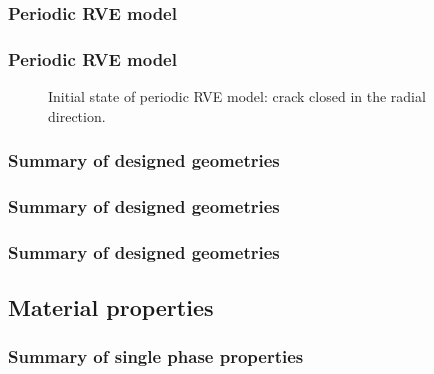 \documentclass[first,firstsupp,lastsupp,handout,last,hyperref,table]{ETHclass}
\begin{document}
\begin{frame}
\frametitle{Periodic RVE model}
\vspace{-0.5cm}
\centering
\begin{figure}[!h]
\centering
{}\quad
{}
  \label{fig:periodicRVE_ccoc}
\end{figure}
\end{frame}

\begin{frame}
\frametitle{Periodic RVE model}
\vspace{-0.75cm}
\centering
\begin{figure}[!h]
\centering
  \caption{\scriptsize Initial state of periodic RVE model: crack closed in the radial direction.}
  \label{fig:periodicRVE_onlycc}
\end{figure}
\end{frame}

\begin{frame}
\frametitle{Summary of designed geometries}
\vspace*{-0.25cm}
\centering

\end{frame}

\begin{frame}
\frametitle{Summary of designed geometries}
\vspace*{-0.25cm}
\centering

\end{frame}

\begin{frame}
\frametitle{Summary of designed geometries}
\vspace*{-0.25cm}
\centering

\end{frame}

\subsection{Material properties}

\begin{frame}
\frametitle{Summary of single phase properties}
\centering

\end{frame}
\end{document}

